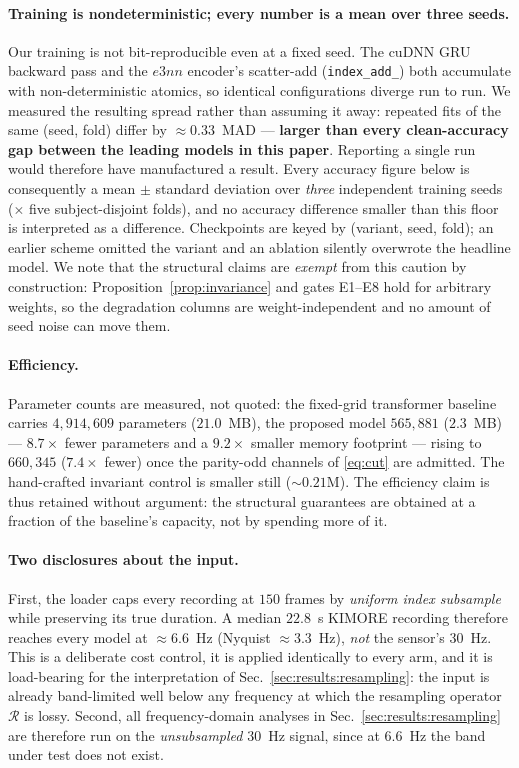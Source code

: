 \paragraph{Training is nondeterministic; every number is a mean over three seeds.}
Our training is not bit-reproducible even at a fixed seed. The cuDNN GRU backward pass and the
$e3nn$ encoder's scatter-add (\texttt{index\_add\_}) both accumulate with non-deterministic atomics, so
identical configurations diverge run to run. We measured the resulting spread rather than assuming it
away: repeated fits of the same (seed, fold) differ by $\approx\!0.33$~MAD --- \textbf{larger than
every clean-accuracy gap between the leading models in this paper}. Reporting a single run would
therefore have manufactured a result. Every accuracy figure below is consequently a mean $\pm$ standard
deviation over \emph{three} independent training seeds ($\times$ five subject-disjoint folds), and no
accuracy difference smaller than this floor is interpreted as a difference. Checkpoints are keyed by
(variant, seed, fold); an earlier scheme omitted the variant and an ablation silently overwrote the
headline model. We note that the structural claims are \emph{exempt} from this caution by
construction: Proposition~\ref{prop:invariance} and gates E1--E8 hold for arbitrary weights, so the
degradation columns are weight-independent and no amount of seed noise can move them.

\paragraph{Efficiency.}
Parameter counts are measured, not quoted: the fixed-grid transformer baseline carries
$4{,}914{,}609$ parameters ($21.0$~MB), the proposed model $565{,}881$ ($2.3$~MB) --- $\mathbf{8.7\times}$
fewer parameters and a $\mathbf{9.2\times}$ smaller memory footprint --- rising to $660{,}345$
($7.4\times$ fewer) once the parity-odd channels of \eqref{eq:cut} are admitted. The hand-crafted
invariant control is smaller still ($\sim\!0.21$M). The efficiency claim is thus retained without
argument: the structural guarantees are obtained at a fraction of the baseline's capacity, not by
spending more of it.

\paragraph{Two disclosures about the input.}
First, the loader caps every recording at $150$ frames by \emph{uniform index subsample} while
preserving its true duration. A median $22.8$~s KIMORE recording therefore reaches every model at
$\approx\!6.6$~Hz (Nyquist $\approx\!3.3$~Hz), \emph{not} the sensor's $30$~Hz. This is a deliberate
cost control, it is applied identically to every arm, and it is load-bearing for the interpretation of
Sec.~\ref{sec:results:resampling}: the input is already band-limited well below any frequency at which
the resampling operator $\mathcal{R}$ is lossy. Second, all frequency-domain analyses in
Sec.~\ref{sec:results:resampling} are therefore run on the \emph{unsubsampled} $30$~Hz signal, since at
$6.6$~Hz the band under test does not exist.
